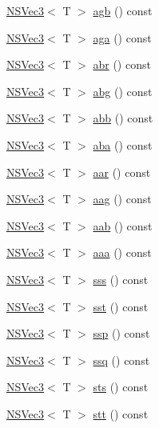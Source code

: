 \begin{DoxyCompactItemize}
\item 
\hyperlink{structNSVec3}{N\-S\-Vec3}$<$ T $>$ \hyperlink{structNSVec4_aa059414425716ad954e2c6d0e59bdc27}{agb} () const 
\item 
\hyperlink{structNSVec3}{N\-S\-Vec3}$<$ T $>$ \hyperlink{structNSVec4_a0f64068edd7cbe13b71e1c32e025b9de}{aga} () const 
\item 
\hyperlink{structNSVec3}{N\-S\-Vec3}$<$ T $>$ \hyperlink{structNSVec4_a7dc23708c8331005edc3da58a98044e0}{abr} () const 
\item 
\hyperlink{structNSVec3}{N\-S\-Vec3}$<$ T $>$ \hyperlink{structNSVec4_a0aff788d02a8d916e1704f0e61fc74db}{abg} () const 
\item 
\hyperlink{structNSVec3}{N\-S\-Vec3}$<$ T $>$ \hyperlink{structNSVec4_a52935e75fb6c8d91ec7a03a606da69ba}{abb} () const 
\item 
\hyperlink{structNSVec3}{N\-S\-Vec3}$<$ T $>$ \hyperlink{structNSVec4_af2637f259bc58a2208e577c54a16eb8c}{aba} () const 
\item 
\hyperlink{structNSVec3}{N\-S\-Vec3}$<$ T $>$ \hyperlink{structNSVec4_a6d7461ea56b03fa3d6e086c2d6a7f34a}{aar} () const 
\item 
\hyperlink{structNSVec3}{N\-S\-Vec3}$<$ T $>$ \hyperlink{structNSVec4_accc6c1e9ba52df387907cea8bec26b35}{aag} () const 
\item 
\hyperlink{structNSVec3}{N\-S\-Vec3}$<$ T $>$ \hyperlink{structNSVec4_a91a624e2a5cf03703320acd01d83e6dd}{aab} () const 
\item 
\hyperlink{structNSVec3}{N\-S\-Vec3}$<$ T $>$ \hyperlink{structNSVec4_a52e2ef2bfee4a461d3d4659593e41a7c}{aaa} () const 
\item 
\hyperlink{structNSVec3}{N\-S\-Vec3}$<$ T $>$ \hyperlink{structNSVec4_ac7250f865c66f393dc04f3072beb913c}{sss} () const 
\item 
\hyperlink{structNSVec3}{N\-S\-Vec3}$<$ T $>$ \hyperlink{structNSVec4_ae8d791cbbf3155475d55e72a62305225}{sst} () const 
\item 
\hyperlink{structNSVec3}{N\-S\-Vec3}$<$ T $>$ \hyperlink{structNSVec4_a65aecfa0365e3a3c565a35d3e550ef49}{ssp} () const 
\item 
\hyperlink{structNSVec3}{N\-S\-Vec3}$<$ T $>$ \hyperlink{structNSVec4_aefb78547c445bb1fed385c24a88fa335}{ssq} () const 
\item 
\hyperlink{structNSVec3}{N\-S\-Vec3}$<$ T $>$ \hyperlink{structNSVec4_afbdc30b099d96f815cadb2c2dc1b2557}{sts} () const 
\item 
\hyperlink{structNSVec3}{N\-S\-Vec3}$<$ T $>$ \hyperlink{structNSVec4_a4576cbb9eed446009fd2ac916dca5d1b}{stt} () const 

\end{DoxyCompactItemize}
